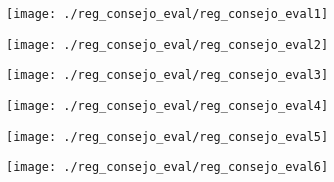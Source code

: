 \begin{figure}[!ht]
    \centering
    \texttt{[image: ./reg\_consejo\_eval/reg\_consejo\_eval1]}
\end{figure}
\clearpage

\begin{figure}[!ht]
    \centering
    \texttt{[image: ./reg\_consejo\_eval/reg\_consejo\_eval2]}
\end{figure}
\clearpage

\begin{figure}[!ht]
    \centering
    \texttt{[image: ./reg\_consejo\_eval/reg\_consejo\_eval3]}
\end{figure}
\clearpage

\begin{figure}[!ht]
    \centering
    \texttt{[image: ./reg\_consejo\_eval/reg\_consejo\_eval4]}
\end{figure}
\clearpage

\begin{figure}[!ht]
    \centering
    \texttt{[image: ./reg\_consejo\_eval/reg\_consejo\_eval5]}
\end{figure}
\clearpage

\begin{figure}[!ht]
    \centering
    \texttt{[image: ./reg\_consejo\_eval/reg\_consejo\_eval6]}
\end{figure}
\clearpage
